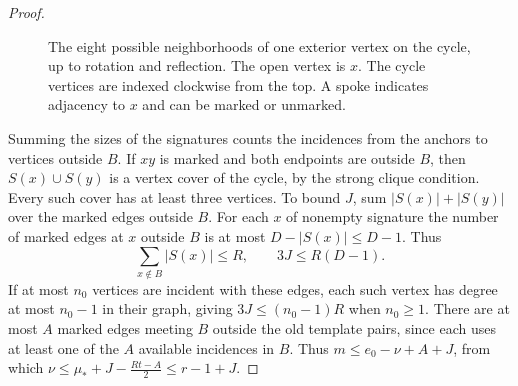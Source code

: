 \documentclass[preprint,11pt,numbers]{elsarticle-arxiv}
\numberwithin{equation}{section}
\theoremstyle{definition}
\begin{document}
\begin{proof}
\begin{figure}[htbp]
\caption{The eight possible neighborhoods of one exterior vertex on the cycle, up to rotation and reflection. The open vertex is $x$. The cycle vertices are indexed clockwise from the top. A spoke indicates adjacency to $x$ and can be marked or unmarked.}
\label{fig:finite-simple-signatures}
\end{figure}
\relax\space%

Summing the sizes of the signatures counts the incidences
from the anchors to vertices outside $B$. If $xy$ is marked
and both endpoints are outside $B$, then $S(x)\cup S(y)$ is
a vertex cover of the cycle, by the strong clique condition.
Every such cover has at least three vertices. To bound $J$,
sum $|S(x)|+|S(y)|$ over the marked edges outside $B$.
For each $x$ of nonempty signature the number of marked edges
at $x$ outside $B$ is at most $D-|S(x)|\leq D-1$. Thus
\begin{equation}\label{eq:odd-interior-slots}
 \sum_{x\notin B}|S(x)|\leq R,\qquad 3J\leq R(D-1).
\end{equation}
If at most $n_0$ vertices are incident with these edges, each such
vertex has degree at most $n_0-1$ in their graph, giving
$3J\leq(n_0-1)R$ when $n_0\geq1$. There are at most $A$ marked
edges meeting $B$ outside the old template pairs, since each uses
at least one of the $A$ available incidences in $B$. Thus
$m\leq e_0-\nu+A+J$, from which
$\nu\leq \mu_*+J-\frac{Rt-A}{2}\leq r-1+J$.


\end{proof}
\end{document}
